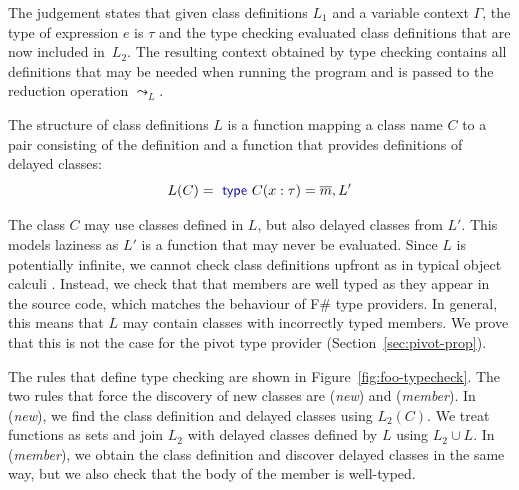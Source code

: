 \documentclass[a4paper,UKenglish]{lipics-v2016}
\theoremstyle{plain}
\theoremstyle{definition}
\newcommand{\kvd}[1]{\textnormal{\textcolor{kvdclr}{\sffamily #1}}}
\begin{document}
\noindent
The judgement states that given class definitions $L_1$ and a variable context $\Gamma$, the type
of expression $e$ is $\tau$ and the type checking evaluated class definitions that are
now included in~$L_2$. The resulting context obtained by type checking contains all definitions
that may be needed when running the program and is passed to the reduction operation $\leadsto_{L}$.

The structure of class definitions $L$ is a function mapping a class name 
$C$ to a pair consisting of the definition and a function that provides definitions of 
delayed classes: 
%
\begin{equation*}
L(C) = \kvd{type}~C(x:\tau) = \overline{m}, L'
\end{equation*}

\noindent
The class $C$ may use classes defined in $L$, but also delayed classes from $L'$. This models 
laziness as $L'$ is a function that may never be evaluated. Since $L$ is potentially infinite, we 
cannot check class definitions upfront as in typical object calculi \cite{objects}. Instead, we check that 
that members are well typed as they appear in the source code, which matches the behaviour of F\# 
type providers. In general, this means that $L$ may contain classes with incorrectly typed 
members. We prove that this is not the case for the pivot type provider (Section~\ref{sec:pivot-prop}).

The rules that define type checking are shown in Figure~\ref{fig:foo-typecheck}. The two rules
that force the discovery of new classes are (\emph{new}) and (\emph{member}). In (\emph{new}), we
find the class definition and delayed classes using $L_2(C)$. We treat functions as sets and 
join $L_2$ with delayed classes defined by $L$ using $L_2 \cup L$. In (\emph{member}), we obtain
the class definition and discover delayed classes in the same way, but we also check that the body
of the member is well-typed.

\end{document}

